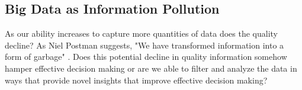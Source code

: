 \subsection{Big Data as Information Pollution}

As our ability increases to capture more quantities of data does the quality decline? As Niel Postman suggests, "We have transformed information into a form of garbage" \cite[cited in][p. 50]{stepp_1999}. Does this potential decline in quality information somehow hamper effective decision making or are we able to filter and analyze the data in ways that provide novel insights that improve effective decision making?


